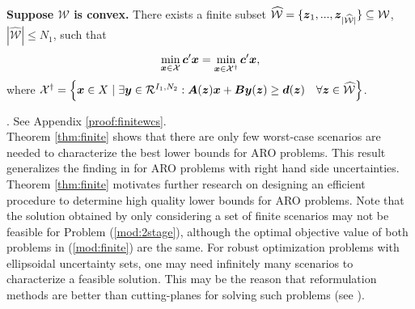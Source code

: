 \documentclass[fleqn,mnsc,blindrev]{informs4}
\newcommand{\mb}[1]{\mbox{\boldmath \ensuremath{#1}}}
\begin{document}
 { \begin{theorem} \label{thm:finite}
		\textbf{Suppose $\mathcal{W}$ is convex.} There exists a finite subset $\widehat{\mathcal{W}} =\{\mb{z}_1, ..., \mb{z}_{|\widehat{\mathcal{W}}|}\} \subseteq \mathcal{W}$, $|\widehat{\mathcal{W}}| \le N_1$, such that
\begin{equation} \label{mod:finite}
		\min_{\boldsymbol{x} \in \mathcal{X}} \mb{c}'\mb{x} = \min_{\boldsymbol{x} \in \mathcal{X}^{\dagger}} \mb{c}'\mb{x},
\end{equation}
		where $\mathcal{X}^{\dagger} = \left\{ \mb{x} \in X \hspace{3pt} | \hspace{3pt}  \exists \mb{y} \in \mathcal{R}^{I_1,N_2}: \mb{A}(\mb{z}) \mb{x}+\mb{B}\mb{y}(\mb{z}) \geq\mb{d}(\mb{z})  \quad  \forall \mb{z} \in  \widehat{\mathcal{W}} \right\} $.
	\end{theorem}	
	. See Appendix \ref{proof:finitewcs}. \hfill \Halmos\\
		
	Theorem \ref{thm:finite} shows that there are only few worst-case scenarios are needed to characterize the best lower bounds for ARO problems. This result generalizes the finding in \cite[Theorem 4.4]{hgk11} for ARO problems with right hand side uncertainties. 	Theorem \ref{thm:finite}  motivates further research on designing an efficient procedure to determine high quality lower bounds for ARO problems. Note that the solution obtained by only considering a set of finite scenarios may not be feasible for Problem (\ref{mod:2stage}), although the optimal objective value of both problems in (\ref{mod:finite}) are the same. For robust optimization problems with ellipsoidal uncertainty sets, one may need infinitely many scenarios to characterize a feasible solution. This may be the reason that reformulation methods are better than cutting-planes for solving such problems (see \cite{bdl15}).

}	\fi 
	
	
	
\end{document}
